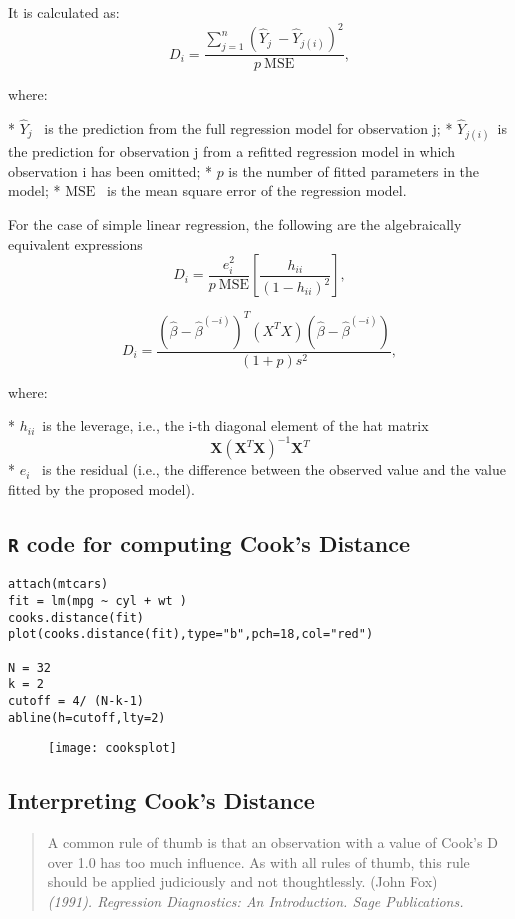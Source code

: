 It is calculated as:
\[D_i = \frac{ \sum_{j=1}^n (\hat Y_j\ - \hat Y_{j(i)})^2 }{p \ \mathrm{MSE}},
\]

where:

*  $\hat Y_j$ \, is the prediction from the full regression model for observation j;
*  $\hat Y_{j(i)}$\, is the prediction for observation j from a refitted regression model in which observation i has been omitted;
*  $p$ is the number of fitted parameters in the model;
*  $\mathrm{MSE} $ \, is the mean square error of the regression model.



For the case of simple linear regression, the following are the algebraically equivalent expressions 
\[D_i = \frac{e_i^2}{p \ \mathrm{MSE}}\left[\frac{h_{ii}}{(1-h_{ii})^2}\right],
\]

\[
D_i = \frac{ (\hat \beta - \hat {\beta}^{(-i)})^T(X^TX)(\hat \beta - \hat {\beta}^{(-i)}) } {(1+p)s^2},
\]

where:

*  $h_{ii} \,$ is the leverage, i.e., the i-th diagonal element of the hat matrix  \[\mathbf{X}\left(\mathbf{X}^T\mathbf{X}\right)^{-1}\mathbf{X}^T\]
*  $e_i$ \, is the residual (i.e., the difference between the observed value and the value fitted by the proposed model).





\subsection*{ \texttt{R} code for computing Cook's Distance}

\begin{verbatim}
attach(mtcars)
fit = lm(mpg ~ cyl + wt )
cooks.distance(fit)
plot(cooks.distance(fit),type="b",pch=18,col="red")

N = 32
k = 2
cutoff = 4/ (N-k-1)
abline(h=cutoff,lty=2)
\end{verbatim}


\begin{figure}[h!]
\centering
\texttt{[image: cooksplot]}
\caption{}
\label{fig:cooksplot}
\end{figure}





\subsection{Interpreting Cook's Distance}
\begin{quote}
A common rule of thumb is that an observation with a value of Cook's D over 1.0 has too much influence. As with all rules of thumb, this rule should be applied judiciously and not thoughtlessly. (John Fox)\\ \textit{(1991). Regression Diagnostics: An Introduction. Sage Publications.}
\end{quote}
\bigskip

